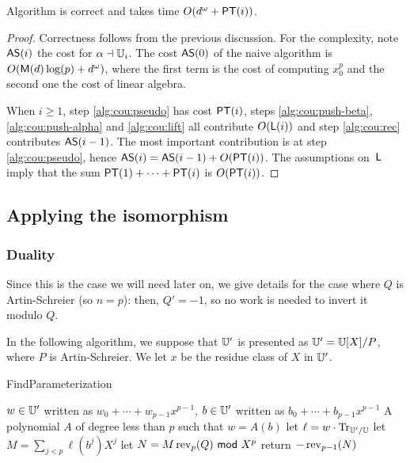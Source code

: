 \begin{theorem}\label{theo:AS}
  Algorithm  is correct and takes time $O(d^\omega
  + \mathrm{\sf PT}(i))$.
\end{theorem}
\begin{proof} Correctness follows from the previous discussion.  For the
complexity, note ${\sf AS}(i)$ the cost for $\alpha\dashv\mathbb{U}_i$. The cost
${\sf AS}(0)$ of the naive algorithm is $O(\mathrm{\sf M}(d)\log(p) +
d^\omega)$, where the first term is the cost of computing $x_0^p$ and
the second one the cost of linear algebra.

When $i\ge1$, step \ref{alg:cou:pseudo} has cost $\mathrm{\sf PT}(i)$, steps
\ref{alg:cou:push-beta}, \ref{alg:cou:push-alpha} and
\ref{alg:cou:lift} all contribute $O(\mathsf{L}(i))$ and step
\ref{alg:cou:rec} contributes ${\sf AS}(i-1)$. The most important
contribution is at step \ref{alg:cou:pseudo}, hence ${\sf AS}(i) =
{\sf AS}(i-1) + O(\mathrm{\sf PT}(i))$. The assumptions on~$\mathsf{L}$ imply that the
sum $\mathrm{\sf PT}(1) + \cdots + \mathrm{\sf PT}(i)$ is $O(\mathrm{\sf PT}(i))$. \end{proof}


\subsection{Applying the isomorphism}

\subsubsection{Duality}\label{ssec:duality}

Since this is the case we will need later on, we give
details for the case where $Q$ is Artin-Schreier (so $n=p$): then,
$Q'=-1$, so no work is needed to invert it modulo $Q$.

In the following algorithm, we suppose that $\mathbb{U}'$ is presented as
$\mathbb{U}'=\mathbb{U}[X]/P$, where $P$ is Artin-Schreier. We let $x$ be the residue
class of $X$ in $\mathbb{U}'$.
\begin{algorithm}
  \caption{FindParameterization}
  \begin{algorithmic}[1]
    \REQUIRE $w \in \mathbb{U}'$ written as $w_0 + \cdots + w_{p-1} x^{p-1}$,  
    $b \in \mathbb{U}'$ written as $b_0 + \cdots + b_{p-1} x^{p-1}$
    \ENSURE A polynomial $A$ of degree less than $p$ such that $w=A(b)$
    \STATE\label{alg:para:trmul} let $\ell = w \cdot\operatorname{Tr}_{\mathbb{U}'/\mathbb{U}}$
    \STATE\label{alg:para:trmodcomp} let $M= \sum_{j < p}\ell(b^j)X^j$
    \STATE\label{alg:para:multrunc} let $N = M \operatorname{rev}_{p}(Q) {\sf ~mod~} X^{p}$
    \STATE\label{alg:para:mulmod} return $-\operatorname{rev}_{p-1}(N)$
  \end{algorithmic}
\end{algorithm}

